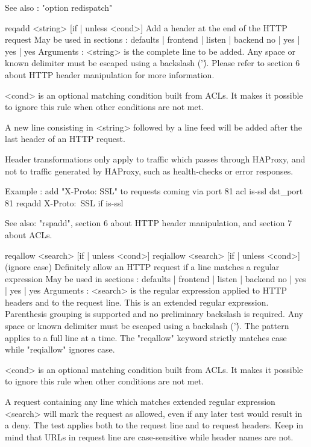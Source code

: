   See also : "option redispatch"


reqadd  <string> [{if | unless} <cond>]
  Add a header at the end of the HTTP request
  May be used in sections :   defaults | frontend | listen | backend
                                 no    |    yes   |   yes  |   yes
  Arguments :
    <string>  is the complete line to be added. Any space or known delimiter
              must be escaped using a backslash ('\'). Please refer to section
              6 about HTTP header manipulation for more information.

    <cond>    is an optional matching condition built from ACLs. It makes it
              possible to ignore this rule when other conditions are not met.

  A new line consisting in <string> followed by a line feed will be added after
  the last header of an HTTP request.

  Header transformations only apply to traffic which passes through HAProxy,
  and not to traffic generated by HAProxy, such as health-checks or error
  responses.

  Example : add "X-Proto: SSL" to requests coming via port 81
     acl is-ssl  dst_port       81
     reqadd      X-Proto:\ SSL  if is-ssl

  See also: "rspadd", section 6 about HTTP header manipulation, and section 7
            about ACLs.


reqallow  <search> [{if | unless} <cond>]
reqiallow <search> [{if | unless} <cond>] (ignore case)
  Definitely allow an HTTP request if a line matches a regular expression
  May be used in sections :   defaults | frontend | listen | backend
                                 no    |    yes   |   yes  |   yes
  Arguments :
    <search>  is the regular expression applied to HTTP headers and to the
              request line. This is an extended regular expression. Parenthesis
              grouping is supported and no preliminary backslash is required.
              Any space or known delimiter must be escaped using a backslash
              ('\'). The pattern applies to a full line at a time. The
              "reqallow" keyword strictly matches case while "reqiallow"
              ignores case.

    <cond>    is an optional matching condition built from ACLs. It makes it
              possible to ignore this rule when other conditions are not met.

  A request containing any line which matches extended regular expression
  <search> will mark the request as allowed, even if any later test would
  result in a deny. The test applies both to the request line and to request
  headers. Keep in mind that URLs in request line are case-sensitive while
  header names are not.

